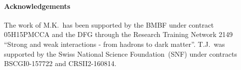\paragraph*{Acknowledgements}
The work of M.K.~has been supported by the BMBF under contract 05H15PMCCA and the DFG through the Research Training Network 2149
``Strong and weak interactions - from hadrons to dark matter''.
T.J.~was supported by the Swiss National Science Foundation~(SNF) under contracts BSCGI0-157722 and CRSII2-160814.

